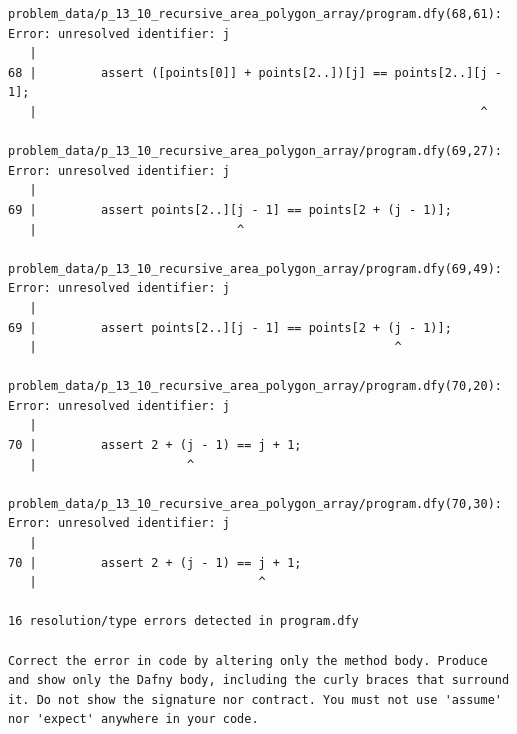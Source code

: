 \documentclass{article}
\begin{document}
\begin{lstlisting}
problem_data/p_13_10_recursive_area_polygon_array/program.dfy(68,61): Error: unresolved identifier: j
   |
68 |         assert ([points[0]] + points[2..])[j] == points[2..][j - 1];
   |                                                              ^

problem_data/p_13_10_recursive_area_polygon_array/program.dfy(69,27): Error: unresolved identifier: j
   |
69 |         assert points[2..][j - 1] == points[2 + (j - 1)];
   |                            ^

problem_data/p_13_10_recursive_area_polygon_array/program.dfy(69,49): Error: unresolved identifier: j
   |
69 |         assert points[2..][j - 1] == points[2 + (j - 1)];
   |                                                  ^

problem_data/p_13_10_recursive_area_polygon_array/program.dfy(70,20): Error: unresolved identifier: j
   |
70 |         assert 2 + (j - 1) == j + 1;
   |                     ^

problem_data/p_13_10_recursive_area_polygon_array/program.dfy(70,30): Error: unresolved identifier: j
   |
70 |         assert 2 + (j - 1) == j + 1;
   |                               ^

16 resolution/type errors detected in program.dfy

Correct the error in code by altering only the method body. Produce and show only the Dafny body, including the curly braces that surround it. Do not show the signature nor contract. You must not use 'assume' nor 'expect' anywhere in your code.
\end{lstlisting}
\end{document}
